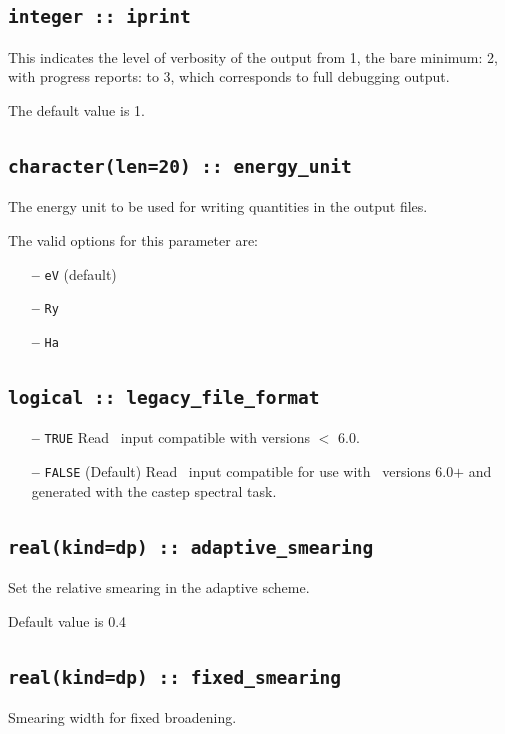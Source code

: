 \documentclass[a4paper,11pt,twoside]{book}
\begin{document}
\subsection[iprint]{\tt integer :: iprint}

This indicates the level of verbosity of the output from 1,
the bare minimum: 2, with progress reports: to 3, which corresponds to full debugging output.

The default value is 1.


\subsection[energy\_unit]{\tt character(len=20) :: energy\_unit}
The energy unit to be used for writing quantities in the output files.

The valid options for this parameter are:
\begin{itemize}
\item[{\bf --}]  \verb#eV# (default)
\item[{\bf --}]  \verb#Ry#
\item[{\bf --}]  \verb#Ha#
\end{itemize}

\subsection[adaptive\_smearing]{\tt logical :: legacy\_file\_format}
\label{sect:lff}
\begin{itemize}
\item[{\bf --}] \verb#TRUE#  Read \castep\ input compatible with versions $<$ 6.0.
\item[{\bf --}] \verb#FALSE# (Default) Read \castep\ input compatible for use with \castep\ versions 6.0$+$ and generated with the castep spectral task.
\end{itemize}

\subsection[adaptive\_smearing]{\tt real(kind=dp) :: adaptive\_smearing}
Set the relative smearing in the adaptive scheme.

Default value is 0.4

\subsection[fixed\_smearing]{\tt real(kind=dp) :: fixed\_smearing}
Smearing width for fixed broadening.
\end{document}
